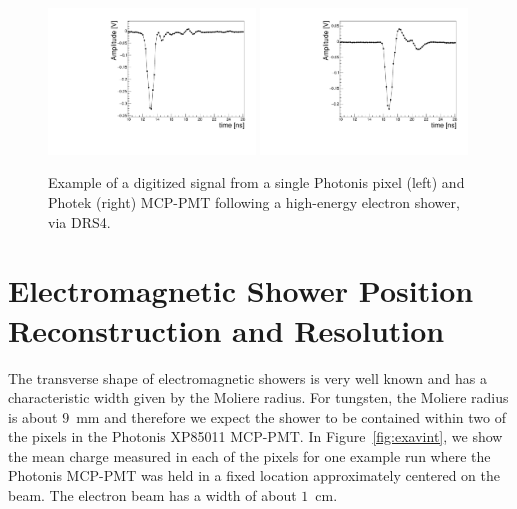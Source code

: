 \documentclass[12pt]{article}
\begin{document}
\begin{figure}[htbp]
	\centering
	\includegraphics[width=0.49\textwidth]{Images/expulse/pulsepix_30_2_12.pdf}
	\includegraphics[width=0.49\textwidth]{Images/expulse/pulseref_30_2_10.pdf}
	\caption{\small Example of a digitized signal from a single Photonis pixel
(left) and Photek (right) MCP-PMT following a high-energy electron shower, via DRS4.}
	\label{fig:expulse}
\end{figure}


\section{ Electromagnetic Shower Position Reconstruction and Resolution}
\label{sec:position} The transverse shape of electromagnetic showers is very
well known and has a characteristic width given by the Moliere radius. For
tungsten, the Moliere radius is about $9$~mm and therefore we expect the shower
to be contained within two of the pixels in the Photonis XP85011 MCP-PMT. In
Figure~\ref{fig:exavint}, we show the mean charge measured in each of the pixels
for one example run where the Photonis MCP-PMT was held in a fixed location
approximately centered on the beam. The electron beam has a width of about
$1$~cm. 
\end{document}
